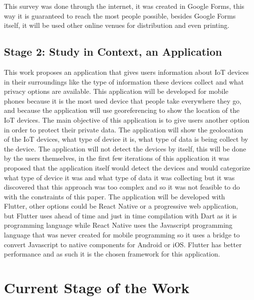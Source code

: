 This survey was done through the internet, it was created in Google Forms,
this way it is guaranteed to reach the most people possible, besides Google
Forms itself, it will be used other online venues for distribution and even
printing.

\subsection{Stage 2: Study in Context, an Application}

This work proposes an application that gives users information about IoT
devices in their surroundings like the type of information these devices
collect and what privacy options are available. This application will be
developed for mobile phones because it is the most used device that people
take everywhere they go, and because the application will use georeferencing
to show the location of the IoT devices. The main objective of this application
is to give users another option in order to protect their private data.
The application will show the geolocation of the IoT devices, what type
of device it is, what type of data is being collect by the device. The application
will not detect the devices by itself, this will be done by the users themselves,
in the first few iterations of this application it was proposed that the
application itself would detect the devices and would categorize what type
of device it was and what type of data it was collecting but it was discovered
that this approach was too complex and so it was not feasible to do with
the constraints of this paper. The application will be developed with Flutter,
other options could be React Native or a progressive web application, but
Flutter uses ahead of time and just in time compilation with Dart as it
is programming language while React Native uses the Javascript programming
language that was never created for mobile programming so it uses a bridge
to convert Javascript to native components for Android or iOS. Flutter has
better performance and as such it is the chosen framework for this application.

\section{Current Stage of the Work}

